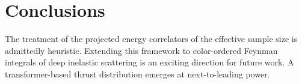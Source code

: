 \section{Conclusions}\label{sec:conclusions}

The treatment of the projected energy correlators of the effective
sample size is admittedly heuristic. Extending this framework to
color-ordered Feynman integrals of deep inelastic scattering is an
exciting direction for future work. A transformer-based thrust
distribution emerges at next-to-leading power.

